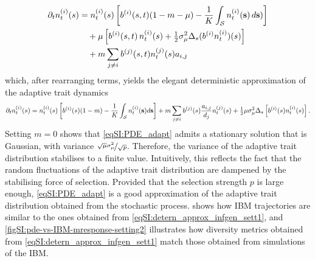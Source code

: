 %
\begin{equation}
  \begin{split}
    \partial_t n_t^{(i)}(s) &= n_t^{(i)}(s)\left[b^{(i)}(s,t)(1-m - \mu) - \frac{1}{K} \int_\mathcal{S} n_t^{(i)}({\textbf s}) \, d {\textbf s})\right] \\
    & \quad + \mu \left[ b^{(i)}(s,t) \, n_t^{(i)}(s) + \tfrac{1}{2} \sigma_\mu^2 \Delta_s (b^{(i)} n_t^{(i)})(s) \right] \\
    & \quad + m \sum_{j \neq i} b^{(j)}(s,t) n_t^{(j)}(s) a_{i,j}
    \end{split}
\end{equation}
which, after rearranging terms, yields the elegant deterministic approximation of the adaptive trait dynamics
%
\begin{equation}\label{eqSI:PDE_adapt}
  \partial_t n_t^{(i)}(s) =n_t^{(i)} (s) \left[b^{(i)}(s)(1-m) -  \frac{1}{K}\int_\mathcal{S}  n_t^{(i)}({\textbf s}) d{\textbf s}  \right] + m \sum_{j\neq i} b^{(j)}(s) \frac{a_{i,j}}{d_j} n_t^{(j)}(s) + \tfrac{1}{2} \mu \sigma_\mu^2 \Delta_s \left[ b^{(i)}(s) n^{(i)}_t(s) \right].
\end{equation}
%
Setting $m = 0$ \cite{Mirrahimi2020} shows that \cref{eqSI:PDE_adapt} admits a stationary solution that is Gaussian, with variance $ \nicefrac{\sqrt{\mu} \sigma_\mu^2}{\sqrt{p}}$. 
%
Therefore, the variance of the adaptive trait distribution stabilises to a finite value. Intuitively, this reflects the fact that the random fluctuations of the adaptive trait distribution are dampened by the stabilising force of selection. Provided that the selection strength $p$ is large enough, \cref{eqSI:PDE_adapt} is a good approximation of the adaptive trait distribution obtained from the stochastic process.
%
 shows how IBM trajectories are similar to the ones obtained from \cref{eqSI:detern_approx_infgen_sett1}, and \cref{figSI:pde-vs-IBM-mresponse-setting2} illustrates how diversity metrics obtained from \cref{eqSI:detern_approx_infgen_sett1} match those obtained from simulations of the IBM.


